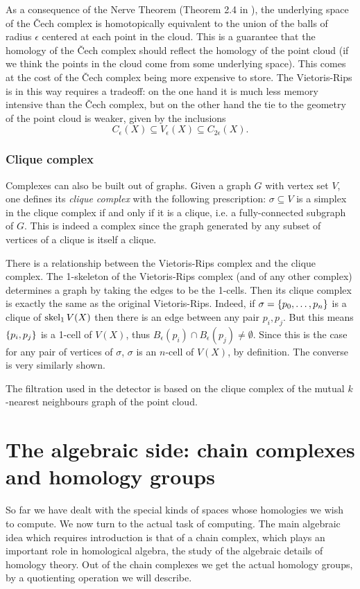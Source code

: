 \documentclass[../main.tex]{subfiles}
\begin{document}
As a consequence of the Nerve Theorem (Theorem 2.4 in \cite{ghrist}), the underlying space
of the Čech complex is homotopically equivalent to the union of the balls of radius \(
\epsilon \) centered at each point in the cloud. This is a guarantee that the homology of
the Čech complex should reflect the homology of the point cloud (if we think the points in
the cloud come from some underlying space). This comes at the cost of the Čech complex
being more expensive to store. The Vietoris-Rips is in this way requires a tradeoff: on
the one hand it is much less memory intensive than the Čech complex, but on the other hand
the tie to the geometry of the point cloud is weaker, given by the inclusions
\begin{equation*}
	C_\epsilon(X) \subseteq V_\epsilon(X) \subseteq C_{2\epsilon}(X). 
\end{equation*}


\subsubsection{Clique complex} \label{sec:clique complex}
Complexes can also be built out of graphs. Given a graph \( G \) with vertex set \( V \),
one defines its \emph{clique complex} with the following prescription: \( \sigma
\subseteq V \) is a simplex in the clique complex if and only if it is a clique, i.e. a
fully-connected subgraph of \( G \). This is indeed a complex since the graph generated by
any subset of vertices of a clique is itself a clique.

There is a relationship between the Vietoris-Rips complex and the clique complex. The
1-skeleton of the Vietoris-Rips complex (and of any other complex) determines a graph by
taking the edges to be the 1-cells. Then its clique complex is exactly the same as the
original Vietoris-Rips. Indeed, if \( \sigma = \left\{ p_0, \dots, p_n \right\} \) is a clique of \(
\operatorname{skel}_1{V(X)} \) then there is an edge between any pair \( p_i, p_j \). But this means
\( \left\{ p_i, p_j \right\} \) is a 1-cell of \( V(X) \), thus \( B_\epsilon(p_i) \cap
B_\epsilon(p_j) \neq \emptyset \). Since this is the case for any pair of vertices of \(
\sigma \), \( \sigma \) is an \( n \)-cell of \( V(X) \), by definition. The converse
is very similarly shown. 

The filtration used in the detector is based on the clique complex of the mutual \( k
\)-nearest neighbours graph of the point cloud. 

\section{The algebraic side: chain complexes and homology groups}\label{sec:algebraic
side}
So far we have dealt with the special kinds of spaces whose homologies we wish to compute.
We now turn to the actual task of computing. The main algebraic idea which requires
introduction is that of a chain complex, which plays an important role in homological
algebra, the study of the algebraic details of homology theory. Out of the chain
complexes we get the actual homology groups, by a quotienting operation we will describe.
\end{document}
